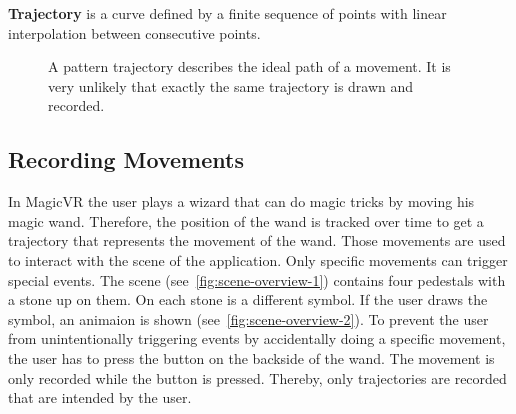 \begin{description}
    \item{\textbf{Trajectory}} is a curve defined by a finite sequence of points
    with linear interpolation between consecutive points.
\end{description}

\begin{figure}[!htbp]
    \centering
    \caption{A pattern trajectory describes the ideal path of a movement.
    It is very unlikely that exactly the same trajectory is drawn and recorded.}
    \label{fig:trajectory-example}
\end{figure}


\subsection{Recording Movements}

In MagicVR the user plays a wizard that can do magic tricks by moving his magic
wand.
Therefore, the position of the wand is tracked over time to get a trajectory that represents the movement of the wand.
Those movements are used to interact with the scene of the application.
Only specific movements can trigger special events.
The scene (see~\autoref{fig:scene-overview-1}) contains four pedestals with a stone up on them.
On each stone is a different symbol.
If the user draws the symbol, an animaion is shown (see~\autoref{fig:scene-overview-2}).
To prevent the user from unintentionally triggering events by accidentally doing a specific movement, the user has to press the button on the backside of the wand.
The movement is only recorded while the button is pressed.
Thereby, only trajectories are recorded that are intended by the user.



